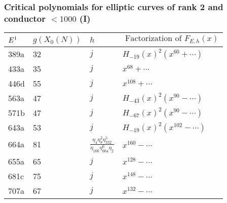 \documentclass[handout]{beamer}
\begin{document}
\begin{frame}
\frametitle{Critical polynomials for elliptic curves of rank 2 and conductor $<1000$ (I)}
\begin{center}
   \begin{table}[h!]
    \begin{tabular}{ | l | l | l | |p{4.4cm}  |}
    \hline
    $E \footnotemark$ & $g(X_0(N))$    & $h$ & $\mbox{ Factorization of } F_{E,h}(x)$     \\ \hline \hline
    389a & 32  & $j$ & $H_{-19}(x)^2 (x^{60}+ \cdots)$ \\ \hline
    433a & 35  & $j$ &  $x^{68}+\cdots$  \\ \hline
     446d & 55  & $j$ &  $x^{108}+\cdots$ \\ \hline
    563a & 47  & $j$ &  $H_{-43}(x)^2 (x^{90} - \cdots)$   \\ \hline
    571b& 47  & $j$ &  $H_{-67}(x)^2 (x^{90} - \cdots)$ \\ \hline
    643a& 53  & $j$ &  $H_{-19}(x)^2 (x^{102} - \cdots)$ \\ \hline
    664a & 81    &   $\frac{\eta_4\eta_8^2 \eta_{332}^5}{\eta_{166}\eta_{664}^{6}{\eta_2}}$ & $x^{160} - \cdots$ \\ \hline
    655a& 65  & $j$ &  $x^{128} - \cdots$ \\  \hline
    681c& 75  & $j$ &  $x^{148} - \cdots$ \\  \hline
    707a & 67  & $j$ & $x^{132} - \cdots$ 
        \end{tabular}
    \label{table: rank two}	
   \end{table}
\end{center}


\end{frame}
 
\end{document}
